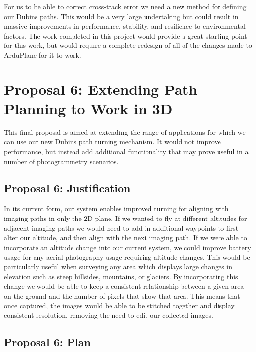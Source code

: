 For us to be able to correct cross-track error we need a new method for defining our Dubins paths. This would be a very large undertaking but could result in massive improvements in performance, stability, and resilience to environmental factors. The work completed in this project would provide a great starting point for this work, but would require a complete redesign of all of the changes made to ArduPlane for it to work.

\section{Proposal 6: Extending Path Planning to Work in 3D} 
\label{future:3d}

This final proposal is aimed at extending the range of applications for which we can use our new Dubins path turning mechanism. It would not improve performance, but instead add additional functionality that may prove useful in a number of photogrammetry scenarios.

\subsection{Proposal 6: Justification}
\label{future:3dreason}

In its current form, our system enables improved turning for aligning with imaging paths in only the 2D plane. If we wanted to fly at different altitudes for adjacent imaging paths we would need to add in additional waypoints to first alter our altitude, and then align with the next imaging path. If we were able to incorporate an altitude change into our current system, we could improve battery usage for any aerial photography usage requiring altitude changes. This would be particularly useful when surveying any area which displays large changes in elevation such as steep hillsides, mountains, or glaciers. By incorporating this change we would be able to keep a consistent relationship between a given area on the ground and the number of pixels that show that area. This means that once captured, the images would be able to be stitched together and display consistent resolution, removing the need to edit our collected images.

\subsection{Proposal 6: Plan} 
\label{future:3dplan}

